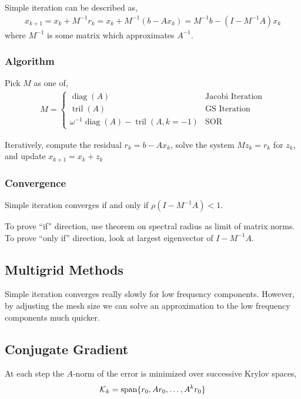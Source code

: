 \documentclass[12pt]{article}
\begin{document}
Simple iteration can be described as,
\begin{align*}
    x_{k+1}= x_k+M^{-1} r_k = x_k + M^{-1}(b-Ax_{k}) = M^{-1}b - (I-M^{-1}A)x_{k}
\end{align*}
where \( M^{-1} \) is some matrix which approximates \( A^{-1} \).

\subsubsection{Algorithm}
Pick \( M \) as one of,
\begin{align*}
    M = \begin{cases}
    \operatorname{diag}(A) & \text{Jacobi Iteration}\\
    \operatorname{tril}(A) & \text{GS Iteration}\\
    \omega^{-1}\operatorname{diag}(A) - \operatorname{tril}(A,k=-1) & \text{SOR}
\end{cases}
\end{align*}

Iteratively, compute the residual \( r_k = b-Ax_k \), solve the system \( Mz_k = r_k \) for \( z_k \), and update \( x_{k+1} = x_{k} + z_{k}  \)

\subsubsection{Convergence}
Simple iteration converges if and only if \( \rho(I-M^{-1}A) < 1 \).

To prove ``if'' direction, use theorem on spectral radius as limit of matrix norms. To prove ``only if'' direction, look at largest eigenvector of \( I-M^{-1}A \).

\subsection{Multigrid Methods}
Simple iteration converges really slowly for low frequency components. However, by adjusting the mesh size we can solve an approximation to the low frequency components much quicker.


\subsection{Conjugate Gradient}
At each step the \( A \)-norm of the error is minimized over successive Krylov spaces,
\begin{align*}
    \mathcal{K}_k = \operatorname{span}\{ r_0, Ar_0, \ldots, A^k r_0 \}
\end{align*}
\end{document}
